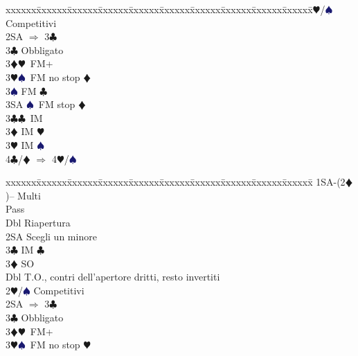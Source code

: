 \documentclass[a4paper,italian]{article}
\newcommand{\BC}{\textcolor{OliveGreen}{$\clubsuit$}}
\newcommand{\BD}{\textcolor{RedOrange}{$\vardiamondsuit$}}
\newcommand{\BH}{\textcolor{Red2}{$\varheartsuit${}}}
\newcommand{\BS}{\textcolor{MidnightBlue}{$\spadesuit${}}}
\newenvironment{bidtable}
{\begin{tabbing}

    xxxxxx\=xxxxxx\=xxxxxx\=xxxxxx\=xxxxxx\=xxxxxx\=xxxxxx\=xxxxxx\=xxxxxx\=xxxxxx\=\kill}
{\end{tabbing} }%
\begin{document}
\begin{multicols}{2}
\begin{bidtable}
                                            2\BH/\BS \> Competitivi\\
                                            2SA \> $\Rightarrow$ 3\BC \+\\
                                            3\BC \> Obbligato\+\\
                                            3\BD {}\BH\ FM+\\
                                            3\BH {}\BS\ FM no stop \BD \\
                                            3\BS \> FM \BC \\
                                            3SA \BS\ FM stop \BD \-\-\\
                                            3\BC {}\BC\ IM\\
                                            3\BD \> IM \BH \\
                                            3\BH \> IM \BS \\
                                            4\BC/\BD \> $\Rightarrow$ 4\BH /\BS \-
                                        \end{bidtable}
                                        \begin{bidtable}
                                            1SA-(2\BD)-- \>\> Multi\+\\
                                            Pass\+\\
                                            Dbl \> Riapertura\\
                                            2SA \> Scegli un minore\\
                                            3\BC \> IM \BC \\
                                            3\BD \> SO\-\\
                                            Dbl \> T.O., contri dell'apertore dritti, resto invertiti\\
                                            2\BH/\BS \> Competitivi\\
                                            2SA \> $\Rightarrow$ 3\BC \+\\
                                            3\BC \> Obbligato\+\\
                                            3\BD {}\BH\ FM+\\
                                            3\BH {}\BS\ FM no stop \BH \\

\end{bidtable}
\end{multicols}
\end{document}
